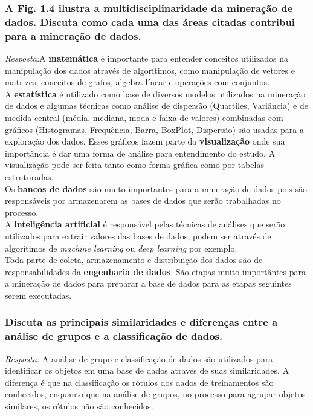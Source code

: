 \documentclass{article}
\begin{document}
\subsubsection{A Fig. 1.4 ilustra a multidisciplinaridade da mineração de dados. Discuta como cada uma das áreas citadas contribui para a mineração de dados.}
\textit{Resposta:}A \textbf{matemática} é importante para entender conceitos utilizados na manipulação dos dados através de algorítimos, como manipulação de vetores e matrizes, conceitos de grafos, algebra línear e operações com conjuntos. \\
A \textbf{estatística} é utilizado como base de diversos modelos utilizados na mineração de dados e algumas técnicas como análise de dispersão (Quartiles, Variância) e de medida central (média, mediana, moda e faixa de valores) combinadas com
gráficos (Histogramas, Frequência, Barra, BoxPlot, Dispersão) são usadas para a exploração dos dados. Esses gráficos fazem parte da \textbf{visualização} onde sua importância é dar uma forma de análise para entendimento do estudo. A visualização pode ser feita tanto como forma gráfica como por tabelas estruturadas. \\
Os \textbf{bancos de dados} são muito importantes para a mineração de dados pois são responsáveis por armazenarem as bases de dados que serão trabalhadas no processo.\\
A \textbf{inteligência artificial} é responsável pelas técnicas de análises que serão utilizados para extrair valores das bases de dados, podem ser através de algorítimos de \textit{machine learning} ou \textit{deep learning} por exemplo.\\
Toda parte de coleta, armazenamento e distribuição dos dados são de responsabilidades da \textbf{engenharia de dados}. São etapas muito importântes para a mineração de dados para preparar a base de dados para as etapas seguintes serem executadas.


\subsubsection{Discuta as principais similaridades e diferenças entre a análise de grupos e a classificação de dados.}
\textit{Resposta:} A análise de grupo e classificação de dados são utilizados para identificar os objetos em uma base de dados através de suas similaridades. A diferença é que na classificação os rótulos dos dados de treinamentos são conhecidos, enquanto que na análise de grupos, no processo para agrupar objetos similares, os rótulos não são conhecidos.
\end{document}
